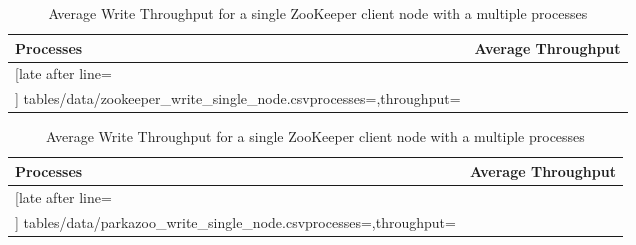 \begin{table}[ht!]
	\centering
	\begin{subtable}{0.45\linewidth}
		\begin{tabular}{|l|c|}\hline%
			\textbf{Processes}   & \textbf{Average Throughput} \\\hline
			\csvreader[late after line=\\\hline]%
			{tables/data/zookeeper_write_single_node.csv}{processes=\processes,throughput=\throughput}%
			{\processes & \throughput}%
		\end{tabular}
		\caption{ZooKeeper}
		\label{table:single_node_zookeeper_throughput}
	\end{subtable}
	\quad
	\begin{subtable}{0.45\linewidth}
		\begin{tabular}{|l|c|}\hline%
			\textbf{Processes}   & \textbf{Average Throughput} \\\hline
			\csvreader[late after line=\\\hline]%
			{tables/data/parkazoo_write_single_node.csv}{processes=\processes,throughput=\throughput}%
			{\processes & \throughput}%
		\end{tabular}
		\caption{ParKazoo}
		\label{table:single_node_parkazoo_throughput}
	\end{subtable}
	\caption{Average Write Throughput for a single ZooKeeper client node with a multiple processes}
	\label{table:single_node_write_throughput}
\end{table}

